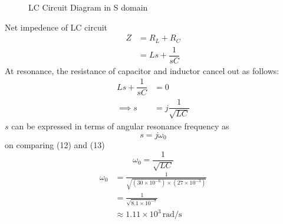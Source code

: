 \documentclass[journal,12pt,twocolumn]{IEEEtran}
\theoremstyle{remark}
\begin{document}
\begin{figure}[H]
    \centering
    
    \caption{LC Circuit Diagram in S domain}
    \label{fig:2}
\end{figure}
Net impedence of LC circuit \\
\begin{align}
Z&=R_L +R_C \\
&=Ls + \dfrac{1}{sC} 
\end{align}
At resonance, the resistance of capacitor and inductor cancel out as follows:
\begin{align}
    Ls + \dfrac{1}{sC} &= 0\\
    \implies s &= j\dfrac{1}{\sqrt{LC}} 
\end{align}
$s$ can be expressed in terms of angular resonance frequency as
\begin{equation}
    s = j\omega_0 
\end{equation}
on comparing (12) and (13)
\begin{equation}
    \omega_0 = \dfrac{1}{\sqrt{LC}}
\end{equation}
\begin{align}
\omega_0 &= \frac{1}{\sqrt{(30 \times 10^{-6}) \times (27 \times 10^{-3})}} \\
&= \frac{1}{\sqrt{8.1 \times 10^{-7}}}\\
& \approx 1.11 \times 10^{3} \, \text{rad/s}
\end{align}
\end{document}
